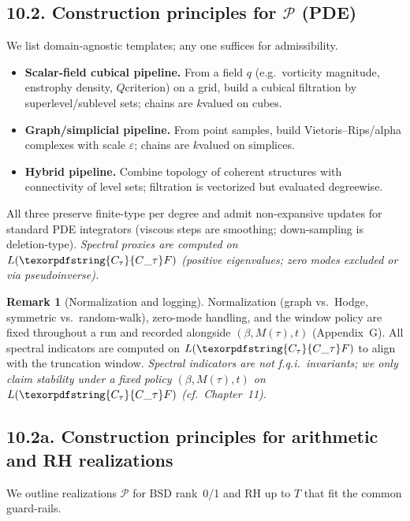 \documentclass[11pt]{article}
\numberwithin{equation}{section}
\theoremstyle{plain}
\theoremstyle{definition}
\theoremstyle{remark}
\DeclareRobustCommand{\hyp}{\nobreakdash-}
\theoremstyle{plain}
\theoremstyle{definition}
\numberwithin{equation}{section}
\theoremstyle{definition}
\newtheorem{remark}[theorem]{Remark}
\DeclareRobustCommand{\Ctau}{\texorpdfstring{\ensuremath{C_{\tau}}}{C\_\tau}}
\numberwithin{equation}{section}
\theoremstyle{plain}
\theoremstyle{definition}
\theoremstyle{remark}
\providecommand{\Cfun}[1]{\mathsf{C}_{#1}}
\providecommand{\Ctau}{\Cfun{\tau}}
\begin{document}
\subsection*{10.2. Construction principles for \texorpdfstring{$\mathcal{P}$}{P} (PDE)}
We list domain\hyp agnostic templates; any one suffices for admissibility.
\begin{itemize}
  \item \textbf{Scalar\hyp field cubical pipeline.} From a field \(q\) (e.g.\ vorticity magnitude, enstrophy density, \(Q\)\nobreakdash criterion) on a grid, build a cubical filtration by superlevel/sublevel sets; chains are \(k\)\nobreakdash valued on cubes.
  \item \textbf{Graph/simplicial pipeline.} From point samples, build Vietoris–Rips/alpha complexes with scale \(\varepsilon\); chains are \(k\)\nobreakdash valued on simplices.
  \item \textbf{Hybrid pipeline.} Combine topology of coherent structures with connectivity of level sets; filtration is vectorized but evaluated degreewise.
\end{itemize}
All three preserve finite\hyp type per degree and admit non\hyp expansive updates for standard PDE integrators (viscous steps are smoothing; down\hyp sampling is deletion\hyp type).
\emph{Spectral proxies are computed on \(L(\Ctau F)\) (positive eigenvalues; zero modes excluded or via pseudoinverse).}

\begin{remark}[Normalization and logging]
Normalization (graph vs.\ Hodge, symmetric vs.\ random\hyp walk), zero\hyp mode handling, and the window policy are fixed throughout a run and recorded alongside \((\beta,M(\tau),t)\) (Appendix~G).
All spectral indicators are computed on \(L(\Ctau F)\) to align with the truncation window.
\emph{Spectral indicators are not f.q.i.\ invariants; we only claim stability under a fixed policy \((\beta,M(\tau),t)\) on \(L(\Ctau F)\) (cf.\ Chapter~11).}
\end{remark}

\subsection*{10.2a. Construction principles for arithmetic and RH realizations}
We outline realizations \(\mathcal{P}\) for BSD rank~0/1 and RH up to \(T\) that fit the common guard\hyp rails.
\end{document}
